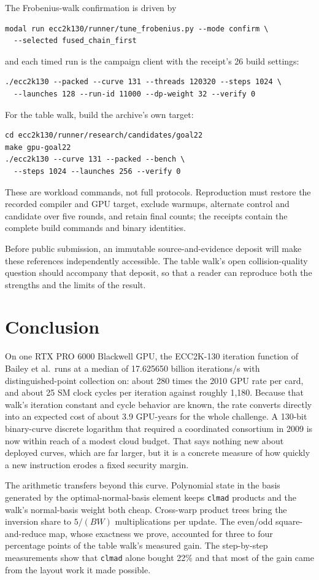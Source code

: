 \documentclass[11pt,a4paper]{article}
\newcommand{\code}[1]{\texttt{\small #1}}
\begin{document}
The Frobenius-walk confirmation is driven by
\begin{lstlisting}
modal run ecc2k130/runner/tune_frobenius.py --mode confirm \
  --selected fused_chain_first
\end{lstlisting}
and each timed run is the campaign client with the receipt's 26 build settings:
\begin{lstlisting}
./ecc2k130 --packed --curve 131 --threads 120320 --steps 1024 \
  --launches 128 --run-id 11000 --dp-weight 32 --verify 0
\end{lstlisting}
For the table walk, build the archive's own target:
\begin{lstlisting}
cd ecc2k130/runner/research/candidates/goal22
make gpu-goal22
./ecc2k130 --curve 131 --packed --bench \
  --steps 1024 --launches 256 --verify 0
\end{lstlisting}
These are workload commands, not full protocols. Reproduction must restore the recorded compiler and GPU target, exclude warmups, alternate control and candidate over five rounds, and retain final counts; the receipts contain the complete build commands and binary identities.

Before public submission, an immutable source-and-evidence deposit will make these references independently accessible. The table walk's open collision-quality question should accompany that deposit, so that a reader can reproduce both the strengths and the limits of the result.

\section{Conclusion}
On one RTX PRO 6000 Blackwell GPU, the ECC2K-130 iteration function of Bailey et al.\ runs at a median of 17.625650 billion iterations/s with distinguished-point collection on: about 280 times the 2010 GPU rate per card, and about 25 SM clock cycles per iteration against roughly 1,180. Because that walk's iteration constant and cycle behavior are known, the rate converts directly into an expected cost of about 3.9 GPU-years for the whole challenge. A 130-bit binary-curve discrete logarithm that required a coordinated consortium in 2009 is now within reach of a modest cloud budget. That says nothing new about deployed curves, which are far larger, but it is a concrete measure of how quickly a new instruction erodes a fixed security margin.

The arithmetic transfers beyond this curve. Polynomial state in the basis generated by the optimal-normal-basis element keeps \code{clmad} products and the walk's normal-basis weight both cheap. Cross-warp product trees bring the inversion share to $5/(BW)$ multiplications per update. The even/odd square-and-reduce map, whose exactness we prove, accounted for three to four percentage points of the table walk's measured gain. The step-by-step measurements show that \code{clmad} alone bought 22\% and that most of the gain came from the layout work it made possible.
\end{document}
